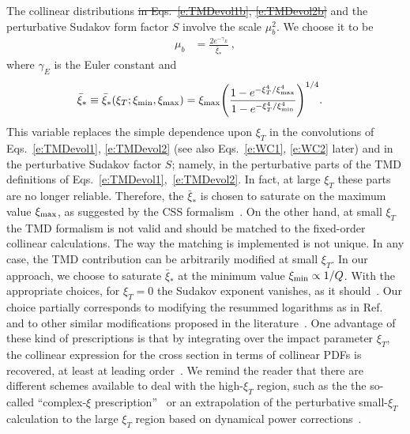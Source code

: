 \documentclass[aps,preprintnumbers,showpacs,nofootinbib,superscriptaddress,floatfix]{revtex4}
\newcommand{\AS}[1]{{\textcolor[rgb]{1,0,1}{#1}}}
\newcommand{\bT}{\xi_T}
\newcommand{\bb}{\xi}
\begin{document}
The collinear distributions \AS{\sout{in Eqs.~\eqref{e:TMDevol1b}, \eqref{e:TMDevol2b}}}
and the perturbative Sudakov form factor $S$ 
involve the 
scale $\mu_b^2$. 
We choose it to be
\begin{align} 
\mu_b &= \frac{2 e^{-\gamma_E}}{\bar{\bb}_{\ast}} \  ,
\label{e:mub}
\end{align}  
where $\gamma_E$ is the Euler constant and
\begin{align} 
\bar{\bb}_{\ast} &\equiv \bar{\bb}_{\ast}(\bT;\bb_{\rm min},\bb_{\rm max}) = \bb_{\rm max} \Bigg(\frac{1-e^{- \bT^4 / \bb_{\rm max}^4} }{1-e^{- \bT^4 / \bb_{\rm min}^4}} \Bigg)^{1/4} .
\label{e:b*}
\end{align}  
This variable replaces the simple dependence upon $\bT$ in the
  convolutions of Eqs.~\eqref{e:TMDevol1}, \eqref{e:TMDevol2} (see also Eqs.~\eqref{e:WC1}, \eqref{e:WC2} later) and in the perturbative
  Sudakov factor $S$; namely, in the perturbative parts of the
  TMD definitions of Eqs.~\eqref{e:TMDevol1},~\eqref{e:TMDevol2}. In fact, at
  large $\bT$ these parts are no longer reliable. Therefore, the
  $\bar{\bb}_{\ast}$ is chosen to saturate on the maximum value $\bb_{\rm max}$,
  as suggested by the CSS 
  formalism~\cite{Collins:2011zzd,Aybat:2011zv}.
On the other hand, at
small $\bT$ the TMD formalism is not valid and should be 
matched to the fixed-order collinear
calculations. The way
the matching is implemented is \AS{not unique}.  In any case, the TMD contribution
can be arbitrarily modified at small $\bT$. In our approach, we choose to
saturate 
$\bar{\bb}_{\ast}$  at
the minimum value $\bb_{\rm min}\propto 1/Q$. With the appropriate choices, 
for $\bT=0$ the Sudakov exponent vanishes, as it
should~\cite{Parisi:1979se,Altarelli:1984pt}. 
Our choice partially corresponds to modifying the resummed logarithms as in
Ref.~\cite{Bozzi:2010xn} and to other similar modifications proposed in the
literature~\cite{Boer:2014tka,Collins:2016hqq}. One advantage of these kind of
prescriptions is that by integrating over the impact parameter $\bT$, the
collinear expression for the cross section in terms of collinear PDFs is
recovered, at least at leading order~\cite{Collins:2016hqq}.
We remind the reader that there are different schemes available to deal with
the high-$\bT$ region, such as the the so-called ``complex-$\bb$
prescription''~\cite{Laenen:2000de} or an extrapolation of the perturbative
small-$\bb_T$ calculation to the large $\bb_T$ region based on dynamical power
corrections~\cite{Qiu:2000hf}. 
\end{document}
